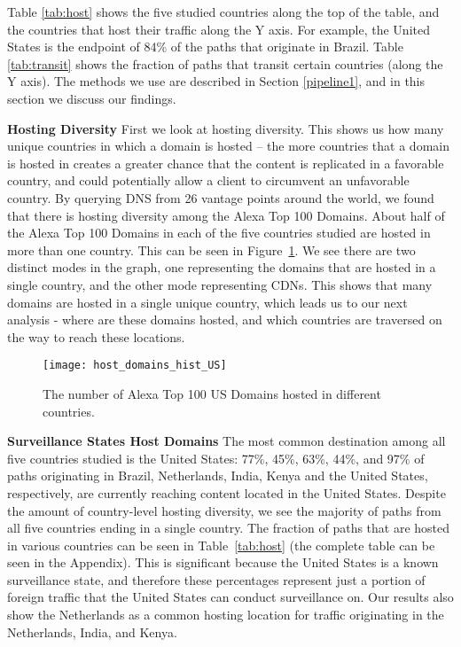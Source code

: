 Table \ref{tab:host} shows the five studied countries along the top of the table, and the countries that host their traffic along the Y axis.  For example, the United States is the endpoint of 84\% of the paths that originate in Brazil.  Table \ref{tab:transit} shows the fraction of paths that transit certain countries (along the Y axis).  The methods we use are described in Section \ref{pipeline1}, and in this section we discuss our findings.

{\bf Hosting Diversity}
First we look at hosting diversity.  This shows us how many unique countries in which a domain is hosted -- the more countries that a domain is hosted in creates a greater chance that the content is replicated in a favorable country, and could potentially allow a client to circumvent an unfavorable country.  By querying DNS from 26 vantage points around the world, we found that there is hosting diversity among the Alexa Top 100 Domains.  About half of the Alexa Top 100 Domains in each of the five countries studied are hosted in more than one country.  This can be seen in Figure~\ref{fig:host_diversity}.  We see there are two distinct modes in the graph, one representing the domains that are hosted in a single country, and the other mode representing CDNs.  This shows that many domains are hosted in a single unique country, which leads us to our next analysis - where are these domains hosted, and which countries are traversed on the way to reach these locations.

\begin{figure}
\centering
\texttt{[image: host\_domains\_hist\_US]}
\caption{The number of Alexa Top 100 US Domains hosted in different countries.}
\label{fig:host_diversity}
\end{figure}

{\bf Surveillance States Host Domains}
The most common destination among all five countries studied is the United States: 77\%, 45\%, 63\%, 44\%, and 97\% of paths originating in Brazil, Netherlands, India, Kenya and the United States, respectively, are currently reaching content located in the United States. Despite the amount of country-level hosting diversity, we see the majority of paths from all five countries ending in a single country.  The fraction of paths that are hosted in various countries can be seen in Table~\ref{tab:host} (the complete table can be seen in the Appendix).  This is significant because the United States is a known surveillance state, and therefore these percentages represent just a portion of foreign traffic that the United States can conduct surveillance on.  Our results also show the Netherlands as a common hosting location for traffic originating in the Netherlands, India, and Kenya.

